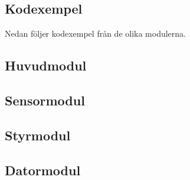 \documentclass[11pt]{article}
\begin{document}
\begin{flushleft}
\pagebreak
\setcounter{section}{15}
\section{Kodexempel}
Nedan följer kodexempel från de olika modulerna.

\subsection{Huvudmodul}


\subsection{Sensormodul}


\subsection{Styrmodul}


\subsection{Datormodul}






\pagebreak

\end{flushleft}
\end{document}
